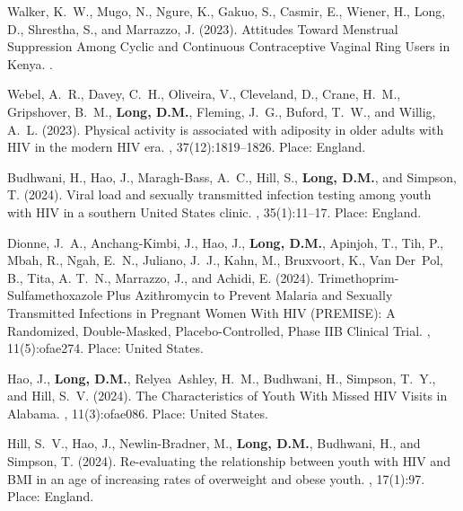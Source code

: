 \begin{thebibliography}{}
Walker, K.~W., Mugo, N., Ngure, K., Gakuo, S., Casmir, E., Wiener, H., Long,
  D., Shrestha, S., and Marrazzo, J. (2023).
\newblock Attitudes {Toward} {Menstrual} {Suppression} {Among} {Cyclic} and
  {Continuous} {Contraceptive} {Vaginal} {Ring} {Users} in {Kenya}.
.

Webel, A.~R., Davey, C.~H., Oliveira, V., Cleveland, D., Crane, H.~M.,
  Gripshover, B.~M., \textbf{Long, D.M.}, Fleming, J.~G., Buford, T.~W., and Willig,
  A.~L. (2023).
\newblock Physical activity is associated with adiposity in older adults with
  {HIV} in the modern {HIV} era.
, 37(12):1819--1826.
\newblock Place: England.

Budhwani, H., Hao, J., Maragh-Bass, A.~C., Hill, S., \textbf{Long, D.M.}, and Simpson,
  T. (2024).
\newblock Viral load and sexually transmitted infection testing among youth
  with {HIV} in a southern {United} {States} clinic.
, 35(1):11--17.
\newblock Place: England.

Dionne, J.~A., Anchang-Kimbi, J., Hao, J., \textbf{Long, D.M.}, Apinjoh, T., Tih, P.,
  Mbah, R., Ngah, E.~N., Juliano, J.~J., Kahn, M., Bruxvoort, K., Van Der~Pol,
  B., Tita, A. T.~N., Marrazzo, J., and Achidi, E. (2024).
\newblock Trimethoprim-{Sulfamethoxazole} {Plus} {Azithromycin} to {Prevent}
  {Malaria} and {Sexually} {Transmitted} {Infections} in {Pregnant} {Women}
  {With} {HIV} ({PREMISE}): {A} {Randomized}, {Double}-{Masked},
  {Placebo}-{Controlled}, {Phase} {IIB} {Clinical} {Trial}.
, 11(5):ofae274.
\newblock Place: United States.


Hao, J., \textbf{Long, D.M.}, Relyea~Ashley, H.~M., Budhwani, H., Simpson, T.~Y., and
  Hill, S.~V. (2024).
\newblock The {Characteristics} of {Youth} {With} {Missed} {HIV} {Visits} in
  {Alabama}.
, 11(3):ofae086.
\newblock Place: United States.


Hill, S.~V., Hao, J., Newlin-Bradner, M., \textbf{Long, D.M.}, Budhwani, H., and
  Simpson, T. (2024).
\newblock Re-evaluating the relationship between youth with {HIV} and {BMI} in
  an age of increasing rates of overweight and obese youth.
, 17(1):97.
\newblock Place: England.



\end{thebibliography}

